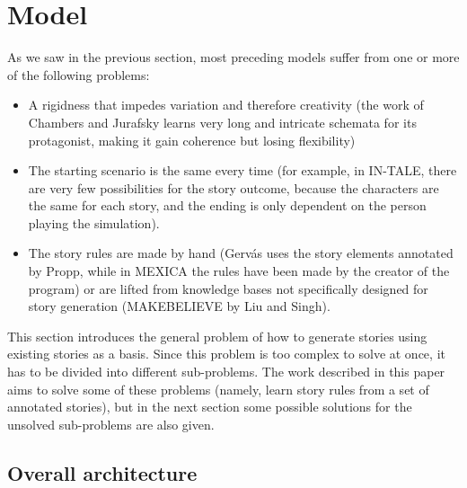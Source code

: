 \section{Model}

As we saw in the previous section, most preceding models suffer from one or more
of the following problems:
\begin{itemize}
	\item A rigidness that impedes variation and therefore creativity (the work
	of Chambers and Jurafsky learns very long and intricate schemata for its
	protagonist, making it gain coherence but losing flexibility)
	\item The starting scenario is the same every time (for
	example, in IN-TALE, there are very few possibilities for the story outcome,
	because the characters are the same for each story, and the ending is only
	dependent on the person playing the simulation).
	\item The story rules are made by hand (Gerv\'as uses the story elements annotated
	by Propp, while in MEXICA the rules have been made by the creator of the
	program) or are lifted from knowledge bases not specifically designed for
	story generation (MAKEBELIEVE by Liu and Singh).
\end{itemize}
This section introduces the general problem of how to generate stories using
existing stories as a basis. Since
this problem is too complex to solve at once, it has to be divided into different sub-problems.
The work described in this paper aims to solve some of these problems (namely,
learn story rules from a set of annotated stories), but in
the next section some possible solutions for the unsolved sub-problems are also
given.

\subsection{Overall architecture}

